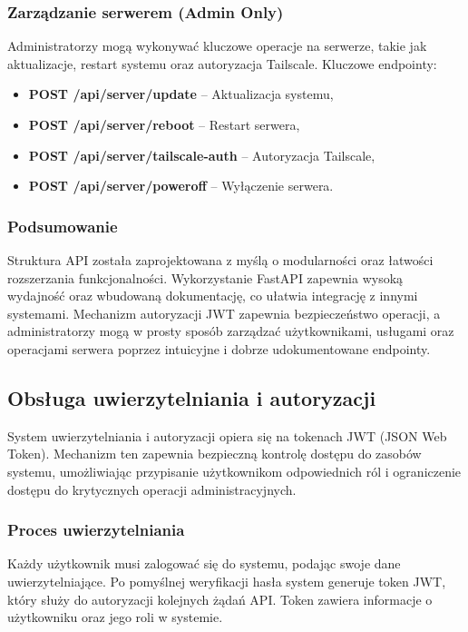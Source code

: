\subsubsection{Zarządzanie serwerem (Admin Only)}
Administratorzy mogą wykonywać kluczowe operacje na serwerze, takie jak aktualizacje, restart systemu oraz autoryzacja Tailscale. Kluczowe endpointy:
\begin{itemize}
    \item \textbf{POST /api/server/update} – Aktualizacja systemu,
    \item \textbf{POST /api/server/reboot} – Restart serwera,
    \item \textbf{POST /api/server/tailscale-auth} – Autoryzacja Tailscale,
    \item \textbf{POST /api/server/poweroff} – Wyłączenie serwera.
\end{itemize}

\subsubsection{Podsumowanie}
Struktura API została zaprojektowana z myślą o modularności oraz łatwości rozszerzania funkcjonalności. Wykorzystanie FastAPI zapewnia wysoką wydajność oraz wbudowaną dokumentację, co ułatwia integrację z innymi systemami. Mechanizm autoryzacji JWT zapewnia bezpieczeństwo operacji, a administratorzy mogą w prosty sposób zarządzać użytkownikami, usługami oraz operacjami serwera poprzez intuicyjne i dobrze udokumentowane endpointy.


\subsection{Obsługa uwierzytelniania i autoryzacji}

System uwierzytelniania i autoryzacji opiera się na tokenach JWT (JSON Web Token). Mechanizm ten zapewnia bezpieczną kontrolę dostępu do zasobów systemu, umożliwiając przypisanie użytkownikom odpowiednich ról i ograniczenie dostępu do krytycznych operacji administracyjnych.

\subsubsection{Proces uwierzytelniania}
Każdy użytkownik musi zalogować się do systemu, podając swoje dane uwierzytelniające. Po pomyślnej weryfikacji hasła system generuje token JWT, który służy do autoryzacji kolejnych żądań API. Token zawiera informacje o użytkowniku oraz jego roli w systemie.

